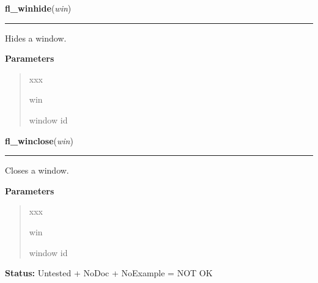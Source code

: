 \hspace{.8\funcindent}\begin{boxedminipage}{\funcwidth}

    \raggedright \textbf{fl\_winhide}(\textit{win})

    \vspace{-1.5ex}

    \rule{\textwidth}{0.5\fboxrule}
\setlength{\parskip}{2ex}
    Hides a window.

\setlength{\parskip}{1ex}
      \textbf{Parameters}
      \vspace{-1ex}

      \begin{quote}
        \begin{Ventry}{xxx}

          \item[win]

          window id

        \end{Ventry}

      \end{quote}

    \end{boxedminipage}

    \label{xformslib:library:fl_winclose}

    \vspace{0.5ex}

\hspace{.8\funcindent}\begin{boxedminipage}{\funcwidth}

    \raggedright \textbf{fl\_winclose}(\textit{win})

    \vspace{-1.5ex}

    \rule{\textwidth}{0.5\fboxrule}
\setlength{\parskip}{2ex}
    Closes a window.

\setlength{\parskip}{1ex}
      \textbf{Parameters}
      \vspace{-1ex}

      \begin{quote}
        \begin{Ventry}{xxx}

          \item[win]

          window id

        \end{Ventry}

      \end{quote}

\textbf{Status:} Untested + NoDoc + NoExample = NOT OK



    \end{boxedminipage}

